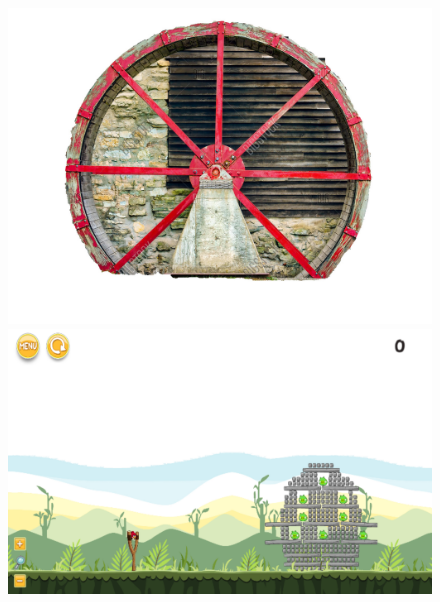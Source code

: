 \documentclass{dalthesis}
\begin{document}
\begin{figure}
  \includegraphics[width=\textwidth,height=\textheight,keepaspectratio]{levels/pictures/mechanisms/water_wheel.jpg}
  \includegraphics[width=\textwidth,height=\textheight,keepaspectratio]{levels/screenshots/mechanisms/water_wheel.png}
\end{figure}
\end{document}

